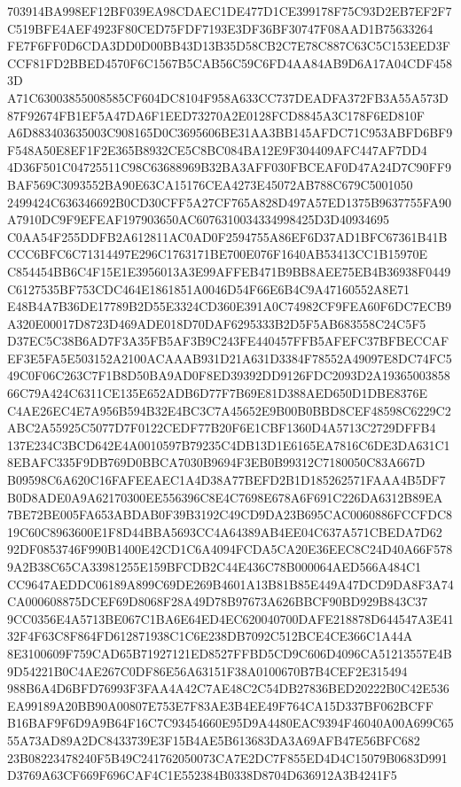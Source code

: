 \documentclass[UTF8,fontset=fandol,zihao=-4,a4paper]{ctexart}
\begin{document}
{{703914BA998EF12BF039EA98CDAEC1DE477D1CE399178F75C93D2EB7EF2F7C519BFE4AEF4923F80CED75FDF7193E3DF36BF30747F08AAD1B75633264
FE7F6FF0D6CDA3DD0D00BB43D13B35D58CB2C7E78C887C63C5C153EED3FCCF81FD2BBED4570F6C1567B5CAB56C59C6FD4AA84AB9D6A17A04CDF4583D
A71C63003855008585CF604DC8104F958A633CC737DEADFA372FB3A55A573D87F92674FB1EF5A47DA6F1EED73270A2E0128FCD8845A3C178F6ED810F
A6D883403635003C908165D0C3695606BE31AA3BB145AFDC71C953ABFD6BF9F548A50E8EF1F2E365B8932CE5C8BC084BA12E9F304409AFC447AF7DD4
4D36F501C04725511C98C63688969B32BA3AFF030FBCEAF0D47A24D7C90FF9BAF569C3093552BA90E63CA15176CEA4273E45072AB788C679C5001050
2499424C636346692B0CD30CFF5A27CF765A828D497A57ED1375B9637755FA90A7910DC9F9EFEAF197903650AC6076310034334998425D3D40934695
C0AA54F255DDFB2A612811AC0AD0F2594755A86EF6D37AD1BFC67361B41BCCC6BFC6C71314497E296C1763171BE700E076F1640AB53413CC1B15970E
C854454BB6C4F15E1E3956013A3E99AFFEB471B9BB8AEE75EB4B36938F0449C6127535BF753CDC464E1861851A0046D54F66E6B4C9A47160552A8E71
E48B4A7B36DE17789B2D55E3324CD360E391A0C74982CF9FEA60F6DC7ECB9A320E00017D8723D469ADE018D70DAF6295333B2D5F5AB683558C24C5F5
D37EC5C38B6AD7F3A35FB5AF3B9C243FE440457FFB5AFEFC37BFBECCAFEF3E5FA5E503152A2100ACAAAB931D21A631D3384F78552A49097E8DC74FC5
49C0F06C263C7F1B8D50BA9AD0F8ED39392DD9126FDC2093D2A1936500385866C79A424C6311CE135E652ADB6D77F7B69E81D388AED650D1DBE8376E
C4AE26EC4E7A956B594B32E4BC3C7A45652E9B00B0BBD8CEF48598C6229C2ABC2A55925C5077D7F0122CEDF77B20F6E1CBF1360D4A5713C2729DFFB4
137E234C3BCD642E4A0010597B79235C4DB13D1E6165EA7816C6DE3DA631C18EBAFC335F9DB769D0BBCA7030B9694F3EB0B99312C7180050C83A667D
B09598C6A620C16FAFEEAEC1A4D38A77BEFD2B1D185262571FAAA4B5DF7B0D8ADE0A9A62170300EE556396C8E4C7698E678A6F691C226DA6312B89EA
7BE72BE005FA653ABDAB0F39B3192C49CD9DA23B695CAC0060886FCCFDC819C60C8963600E1F8D44BBA5693CC4A64389AB4EE04C637A571CBEDA7D62
92DF0853746F990B1400E42CD1C6A4094FCDA5CA20E36EEC8C24D40A66F5789A2B38C65CA33981255E159BFCDB2C44E436C78B000064AED566A484C1
CC9647AEDDC06189A899C69DE269B4601A13B81B85E449A47DCD9DA8F3A74CA000608875DCEF69D8068F28A49D78B97673A626BBCF90BD929B843C37
9CC0356E4A5713BE067C1BA6E64ED4EC620040700DAFE218878D644547A3E4132F4F63C8F864FD612871938C1C6E238DB7092C512BCE4CE366C1A44A
8E3100609F759CAD65B71927121ED8527FFBD5CD9C606D4096CA51213557E4B9D54221B0C4AE267C0DF86E56A63151F38A0100670B7B4CEF2E315494
988B6A4D6BFD76993F3FAA4A42C7AE48C2C54DB27836BED20222B0C42E536EA99189A20BB90A00807E753E7F83AE3B4EE49F764CA15D337BF062BCFF
B16BAF9F6D9A9B64F16C7C93454660E95D9A4480EAC9394F46040A00A699C6555A73AD89A2DC8433739E3F15B4AE5B613683DA3A69AFB47E56BFC682
23B08223478240F5B49C241762050073CA7E2DC7F855ED4D4C15079B0683D991D3769A63CF669F696CAF4C1E552384B0338D8704D636912A3B4241F5
}}
\end{document}
